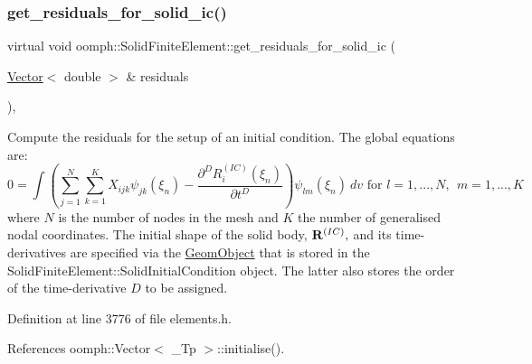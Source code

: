 \subsubsection{\texorpdfstring{get\+\_\+residuals\+\_\+for\+\_\+solid\+\_\+ic()}{get\_residuals\_for\_solid\_ic()}}
{\footnotesize\ttfamily virtual void oomph\+::\+Solid\+Finite\+Element\+::get\+\_\+residuals\+\_\+for\+\_\+solid\+\_\+ic (\begin{DoxyParamCaption}\item[{\hyperlink{classoomph_1_1Vector}{Vector}$<$ double $>$ \&}]{residuals }\end{DoxyParamCaption})\hspace{0.3cm}{\ttfamily [inline]}, {\ttfamily [virtual]}}



Compute the residuals for the setup of an initial condition. The global equations are\+: \[ 0 = \int \left( \sum_{j=1}^N \sum_{k=1}^K X_{ijk} \psi_{jk}(\xi_n) - \frac{\partial^D R^{(IC)}_i(\xi_n)}{\partial t^D} \right) \psi_{lm}(\xi_n) \ dv \mbox{ \ \ \ \ for \ \ \ $l=1,...,N, \ \ m=1,...,K$} \] where $ N $ is the number of nodes in the mesh and $ K $ the number of generalised nodal coordinates. The initial shape of the solid body, $ {\bf R}^{(IC)},$ and its time-\/derivatives are specified via the {\ttfamily \hyperlink{classoomph_1_1GeomObject}{Geom\+Object}} that is stored in the {\ttfamily Solid\+Finite\+Element\+::\+Solid\+Initial\+Condition} object. The latter also stores the order of the time-\/derivative $ D $ to be assigned. 



Definition at line 3776 of file elements.\+h.



References oomph\+::\+Vector$<$ \+\_\+\+Tp $>$\+::initialise().

\mbox{\label{classoomph_1_1SolidFiniteElement_a2e557cb3647e40fe3225bab4d8f834a0}} 
